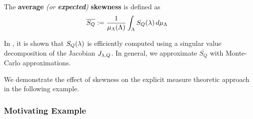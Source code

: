 \begin{defn}
The \textbf{average} \emph{(or \textbf{expected})} \textbf{skewness} is defined as
\begin{equation}
\overline{S_Q} := \frac{1}{\mu_{{\Lambda}}({\Lambda})} \int_{\Lambda} S_Q (\lambda) \, d\mu_{{\Lambda}}
\label{eq:avgskew}
\end{equation}
\end{defn}

In \cite{BPW17}, it is shown that $S_Q(\lambda)$ is efficiently computed using a singular value decomposition of the Jacobian $J_{\lambda,Q}$.
In general, we approximate $\overline{S_Q}$ with Monte-Carlo approximations.

We demonstrate the effect of skewness on the explicit measure theoretic approach in the following example.

\subsubsection{Motivating Example}

